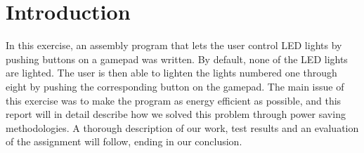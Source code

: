 \section{Introduction}

In this exercise, an assembly program that lets the user control LED lights by pushing buttons on a gamepad was written.
By default, none of the LED lights are lighted.
The user is then able to lighten the lights numbered one through eight by pushing the corresponding button on the gamepad.
The main issue of this exercise was to make the program as energy efficient as possible, and this report will in detail describe how we solved this problem through power saving methodologies.
A thorough description of our work, test results and an evaluation of the assignment will follow, ending in our conclusion.
